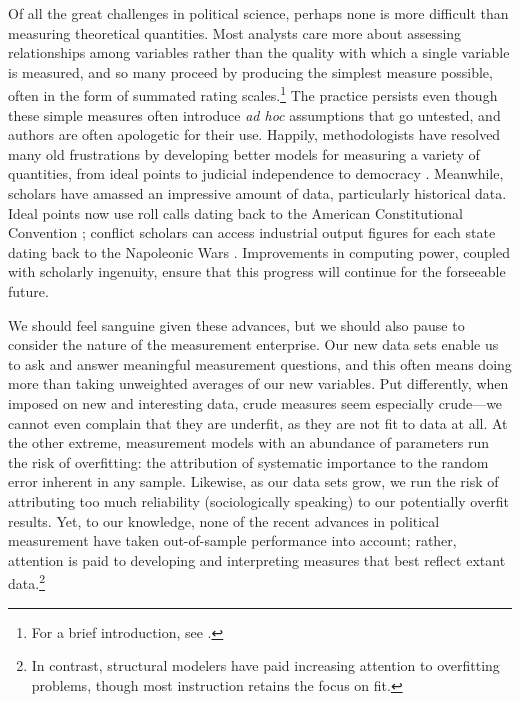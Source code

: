 
Of all the great challenges in political science, perhaps none is more difficult than measuring theoretical quantities.
Most analysts care more about assessing relationships among variables rather than the quality with which a single variable is measured, and so many proceed by producing the simplest measure possible, often in the form of summated rating scales.\footnote{For a brief introduction, see \citet{spector2006}.}
The practice persists even though these simple measures often introduce \emph{ad hoc} assumptions that go untested, and authors are often apologetic for their use.
Happily, methodologists have resolved many old frustrations by developing better models for measuring a variety of quantities, from ideal points \citep{clinton2004} to judicial independence \citep{linzer2014} to democracy \citep{jackman2008}.
Meanwhile, scholars have amassed an impressive amount of data, particularly historical data.
Ideal points now use roll calls dating back to the American Constitutional Convention \citep{heckelman2013}; conflict scholars can access industrial output figures for each state dating back to the Napoleonic Wars \citep{singer1972}.
Improvements in computing power, coupled with scholarly ingenuity, ensure that this progress will continue for the forseeable future.

We should feel sanguine given these advances, but we should also pause to consider the nature of the measurement enterprise.
Our new data sets enable us to ask and answer meaningful measurement questions, and this often means doing more than taking unweighted averages of our new variables.
Put differently, when imposed on new and interesting data, crude measures seem especially crude---we cannot even complain that they are underfit, as they are not fit to data at all.
At the other extreme, measurement models with an abundance of parameters run the risk of overfitting:  the attribution of systematic importance to the random error inherent in any sample.
Likewise, as our data sets grow, we run the risk of attributing too much reliability (sociologically speaking) to our potentially overfit results.
Yet, to our knowledge, none of the recent advances in political measurement have taken out-of-sample performance into account; rather, attention is paid to developing and interpreting measures that best reflect extant data.\footnote{In contrast, structural modelers have paid increasing attention to overfitting problems\citep{pitt2002,preacher2006}, though most instruction retains the focus on fit.}

